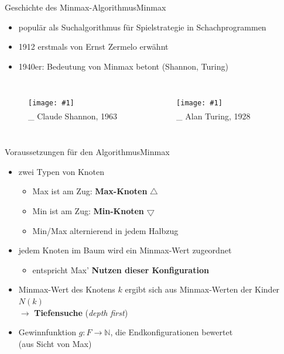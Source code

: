 \documentclass[18pt, aspectratio=169, handout]{beamer}
\newcommand\citeh[1]{\textsuperscript{\cite{#1}}}
\newcommand\g[3]{%
  \begin{figure}[!ht]
  \centering
  \texttt{[image: \#1]}
  {\small#3}
  \end{figure}}
\begin{document}
\begin{frame}{Geschichte des Minmax-Algorithmus}{Minmax}
	\begin{itemize}
		\item populär als Suchalgorithmus für Spielstrategie in Schachprogrammen
		\item 1912 erstmals von Ernst Zermelo erwähnt
		\item 1940er: Bedeutung von Minmax betont (Shannon, Turing)
	\end{itemize}

  \begin{columns}
	  \g{img/shannon.jpg}{0.35}{\\\_ Claude Shannon, 1963\citeh{img_shannon}}
	  
	  \g{img/turing.jpg}{0.35}{\\\_ Alan Turing, 1928\citeh{img_turing}}

  \end{columns}
\end{frame}

\begin{frame}{Voraussetzungen für den Algorithmus}{Minmax}
	\begin{itemize}
	\item
	  zwei Typen von Knoten
	  \pause
	  \begin{itemize}
	  	\item Max ist am Zug: \textbf{Max-Knoten} \quad $\bigtriangleup$
	  	\item Min ist am Zug: \textbf{Min-Knoten} \quad $\bigtriangledown$
		  \item Min/Max alternierend in jedem Halbzug
  	\end{itemize}
  	\pause
  	\item jedem Knoten im Baum wird ein Minmax-Wert zugeordnet
  	\begin{itemize}
  		\item entspricht Max' \textbf{Nutzen dieser Konfiguration}
		\end{itemize}
		\pause
		\item Minmax-Wert des Knotens $k$ ergibt sich aus Minmax-Werten der Kinder $N(k)$\\ $\rightarrow$ \textbf{Tiefensuche} (\textit{depth first})
		\pause
		\item Gewinnfunktion $g: F \to \mathbb{N}$, die Endkonfigurationen bewertet\\(aus Sicht von Max)
	\end{itemize}
\end{frame}
\end{document}
